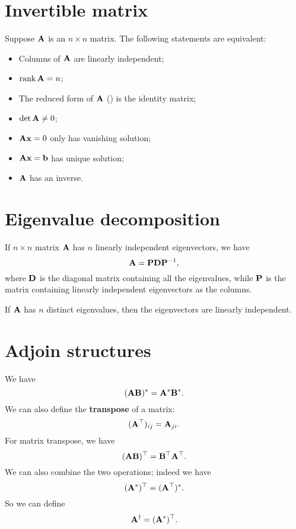 \documentclass[hyperref, a4paper]{article}
\newcommand*{\concept}[1]{{\textbf{#1}}}
\newcommand*{\mat}[1]{\vb{#1}}
\begin{document}
\section{Invertible matrix}

Suppose $\mat{A}$ is an $n \times n$ matrix.
The following statements are equivalent:
\begin{itemize}
    \item Columns of $\mat{A}$ are linearly independent;
    \item $\rank \mat{A} = n$;
    \item The reduced form of $\mat{A}$ () 
        is the identity matrix;
    \item $\det \mat{A} \neq 0$;
    \item $\mat{A} \vb{x} = 0$ only has vanishing solution;
    \item $\mat{A} \vb{x} = \vb{b}$ has unique solution;
    \item $\mat{A}$ has an inverse.
\end{itemize}

\section{Eigenvalue decomposition}

If $n \times n$ matrix $\mat{A}$ has $n$ linearly independent eigenvectors, 
we have 
\begin{equation}
    \mat{A} = \mat{P} \mat{D} \mat{P}^{-1},
\end{equation}
where $\mat{D}$ is the diagonal matrix 
containing all the eigenvalues, 
while $\mat{P}$ is the matrix containing linearly independent eigenvectors 
as the columns. 

If $\mat{A}$ has $n$ distinct eigenvalues, 
then the eigenvectors are linearly independent.

\section{Adjoin structures}

We have 
\begin{equation}
    (\mat{A} \mat{B})^* = \mat{A}^* \mat{B}^*.
\end{equation}
We can also define the \concept{transpose} of a matrix: 
\begin{equation}
    (\mat{A}^\top)_{ij} = \mat{A}_{ji}.
\end{equation}
For matrix transpose, we have 
\begin{equation}
    (\mat{A} \mat{B})^\top = \mat{B}^\top \mat{A}^\top.
\end{equation}
We can also combine the two operations;
indeed we have 
\begin{equation}
    (\mat{A}^*)^\top = (\mat{A}^\top)^*.
\end{equation}
So we can define 
\begin{equation}
    \mat{A}^\dagger = (\mat{A}^*)^\top.
\end{equation}
\end{document}
